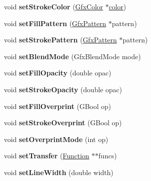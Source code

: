 \begin{DoxyCompactItemize}
void {\bfseries set\+Stroke\+Color} (\hyperlink{struct_gfx_color}{Gfx\+Color} $\ast$\hyperlink{structcolor}{color})
\item 
\mbox{\label{class_gfx_state_af3cd9ea3e8f979858ece0921bc335c15}} 
void {\bfseries set\+Fill\+Pattern} (\hyperlink{class_gfx_pattern}{Gfx\+Pattern} $\ast$pattern)
\item 
\mbox{\label{class_gfx_state_a943f65c57b91f5e40fc1e836a6cb4fd8}} 
void {\bfseries set\+Stroke\+Pattern} (\hyperlink{class_gfx_pattern}{Gfx\+Pattern} $\ast$pattern)
\item 
\mbox{\label{class_gfx_state_a70c68a810fd7fc9a33db6df1e8eaaed9}} 
void {\bfseries set\+Blend\+Mode} (Gfx\+Blend\+Mode mode)
\item 
\mbox{\label{class_gfx_state_a3586ceb5f7207b880f5be561d835466f}} 
void {\bfseries set\+Fill\+Opacity} (double opac)
\item 
\mbox{\label{class_gfx_state_a8d0c28171a74f6bef6046c0721714ec1}} 
void {\bfseries set\+Stroke\+Opacity} (double opac)
\item 
\mbox{\label{class_gfx_state_a4257d9319f1572922633ae6df38efe0f}} 
void {\bfseries set\+Fill\+Overprint} (G\+Bool op)
\item 
\mbox{\label{class_gfx_state_a61bd675b8f2aa30e083f1b3e27a3f4f4}} 
void {\bfseries set\+Stroke\+Overprint} (G\+Bool op)
\item 
\mbox{\label{class_gfx_state_a2b4da6d962d6b62116e0fefbafa33fdd}} 
void {\bfseries set\+Overprint\+Mode} (int op)
\item 
\mbox{\label{class_gfx_state_a9ed8ddcf2a136337f2455c9b6c26c963}} 
void {\bfseries set\+Transfer} (\hyperlink{class_function}{Function} $\ast$$\ast$funcs)
\item 
\mbox{\label{class_gfx_state_a8139b2f0f6473704a9c262e36a3f97d9}} 
void {\bfseries set\+Line\+Width} (double width)
\item 
\mbox{\label{class_gfx_state_a0b2fd51e105f614fd4da6a04ba4b3d55}} 
$$
\end{DoxyCompactItemize}
